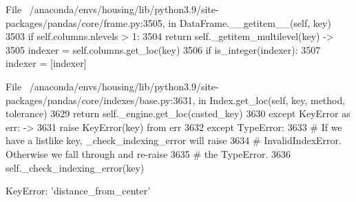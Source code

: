 File ~/anaconda/envs/housing/lib/python3.9/site-packages/pandas/core/frame.py:3505, in DataFrame.__getitem__(self, key)
   3503 if self.columns.nlevels > 1:
   3504     return self._getitem_multilevel(key)
-> 3505 indexer = self.columns.get_loc(key)
   3506 if is_integer(indexer):
   3507     indexer = [indexer]

File ~/anaconda/envs/housing/lib/python3.9/site-packages/pandas/core/indexes/base.py:3631, in Index.get_loc(self, key, method, tolerance)
   3629     return self._engine.get_loc(casted_key)
   3630 except KeyError as err:
-> 3631     raise KeyError(key) from err
   3632 except TypeError:
   3633     # If we have a listlike key, _check_indexing_error will raise
   3634     #  InvalidIndexError. Otherwise we fall through and re-raise
   3635     #  the TypeError.
   3636     self._check_indexing_error(key)

KeyError: 'distance_from_center'
